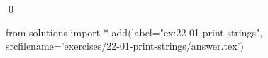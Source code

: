 
\begin{ex}
  \label{ex:22-01-print-strings}
  
  \qed
\end{ex}
\begin{python0}
from solutions import *
add(label="ex:22-01-print-strings",
    srcfilename='exercises/22-01-print-strings/answer.tex')
\end{python0}
